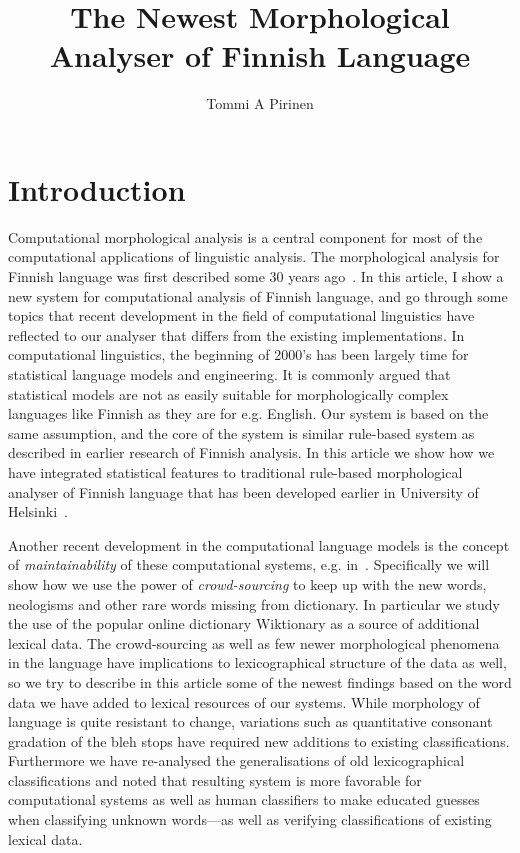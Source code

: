 \documentclass[a4paper,12pt]{article}
\title{The Newest Morphological Analyser of Finnish Language}
\author{Tommi A Pirinen}
\begin{document}
\section{Introduction}

Computational morphological analysis is a central component for most of the
computational applications of linguistic analysis. The morphological analysis
for Finnish language was first described some 30 years ago~\cite{}. In this
article, I show a new system for computational analysis of Finnish language,
and go through some topics that recent development in the field of computational
linguistics have reflected to our analyser that differs from the existing
implementations. In computational linguistics, the beginning of 2000's has been
largely time for statistical language models and engineering. It is commonly
argued that statistical models are not as easily suitable for morphologically
complex languages like Finnish as they are for e.g. English. Our system is
based on the same assumption, and the core of the system is similar rule-based
system as described in earlier research of Finnish analysis. In this article
we show how we have integrated statistical features to traditional rule-based
morphological analyser of Finnish language that has been developed
earlier in University of Helsinki~\cite{pirinen2008}.

Another recent development in the computational language models is the concept
of \emph{maintainability} of these computational systems, e.g.
in~\cite{maxwell}. Specifically we will show how we use the power of
\emph{crowd-sourcing} to keep up with the new words, neologisms and other rare
words missing from dictionary. In particular we study the use of the popular
online dictionary Wiktionary as a source of additional lexical data. The
crowd-sourcing as well as few newer morphological phenomena in the language
have implications to lexicographical structure of the data as well, so we try
to describe in this article some of the newest findings based on the word data
we have added to lexical resources of our systems. While morphology of language
is quite resistant to change, variations such as quantitative consonant
gradation of the bleh stops have required new additions to existing
classifications. Furthermore we have re-analysed the generalisations of old
lexicographical classifications and noted that resulting system is more
favorable for computational systems as well as human classifiers to make
educated guesses when classifying unknown words---as well as verifying
classifications of existing lexical data.
\end{document}
